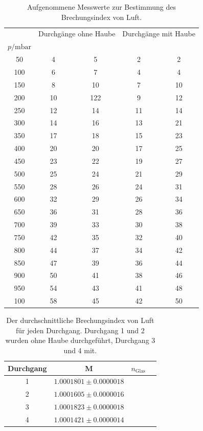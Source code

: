 \begin{table}
  \centering
  \caption{Aufgenommene Messwerte zur Bestimmung des Brechungsindex von Luft.}
  \label{tab:Luft}
  \begin{tabular}{c c c c c}
    \toprule
    & \multicolumn{2}{c}{Durchgänge ohne Haube} & \multicolumn{2}{c}{Durchgänge mit Haube} \\
    \cmidrule(lr){2-3} \cmidrule(lr){4-5}
    $p / \si{\milli\bar}$ \\
    \midrule
    50    &   4    &   5    &   2     &    2   \\
    100   &   6    &   7    &   4     &    4   \\
    150   &   8    &   10   &   7     &    10  \\
    200   &   10   &   122  &   9     &    12  \\
    250   &   12   &   14   &   11    &    14  \\
    300   &   14   &   16   &   13    &    21  \\
    350   &   17   &   18   &   15    &    23  \\
    400   &   20   &   20   &   17    &    25  \\
    450   &   23   &   22   &   19    &    27  \\
    500   &   25   &   24   &   21    &    29  \\
    550   &   28   &   26   &   24    &    31  \\
    600   &   32   &   29   &   26    &    34  \\
    650   &   36   &   31   &   28    &    36  \\
    700   &   39   &   33   &   30    &    38  \\
    750   &   42   &   35   &   32    &    40  \\
    800   &   44   &   37   &   34    &    42  \\
    850   &   47   &   39   &   36    &    44  \\
    900   &   50   &   41   &   38    &    46  \\
    950   &   54   &   43   &   41    &    48  \\
    100   &   58   &   45   &   42    &    50  \\ 
    \bottomrule
  \end{tabular}
\end{table}

\begin{table}
  \centering
  \caption{Der durchschnittliche Brechungsindex von Luft für jeden Durchgang. Durchgang 1 und 2 wurden ohne Haube durchgeführt, Durchgang 3 und 4 mit.}
  \label{tab:n_luft_mean}
  \begin{tabular}{c c c c}
    \toprule
    Durchgang & M & $n_\text{Glas}$ \\
    \midrule
    1    &  $1.0001801 \pm 0.0000018$ \\   
    2    &  $1.0001605 \pm 0.0000016$ \\   
    3    &  $1.0001823 \pm 0.0000018$ \\   
    4    &  $1.0001421 \pm 0.0000014$ \\   
    \bottomrule
  \end{tabular}
\end{table}